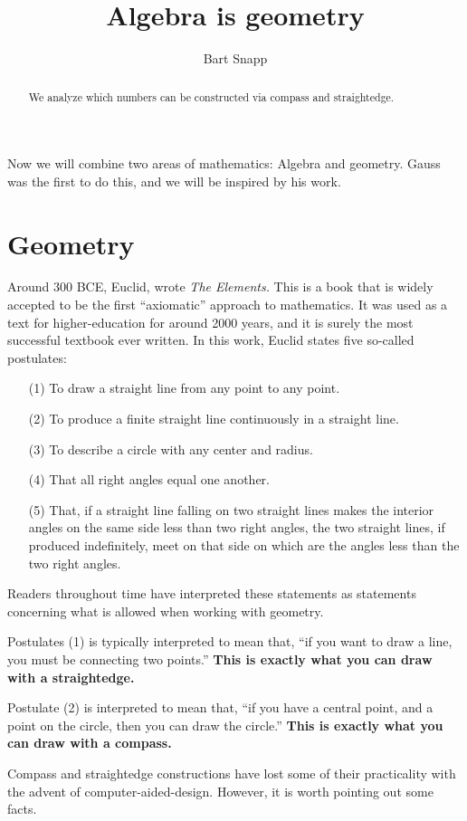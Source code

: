 \documentclass{ximera}
\author{Bart Snapp}
\title{Algebra is geometry}
\begin{document}
\begin{abstract}
  We analyze which numbers can be constructed via compass and
  straightedge.
\end{abstract}
\maketitle


Now we will combine two areas of mathematics: Algebra and
geometry. Gauss was the first to do this, and we will be inspired by
his work.

\section{Geometry}

Around 300 BCE, Euclid, wrote \textit{The Elements.} This is a book
that is widely accepted to be the first ``axiomatic'' approach to
mathematics. It was used as a text for higher-education for around
2000 years, and it is surely the most successful textbook ever
written. In this work, Euclid states five so-called postulates:
\begin{enumerate}
\item[(1)] To draw a straight line from any point to any point.
\item[(2)] To produce a finite straight line continuously in a straight line.
\item[(3)] To describe a circle with any center and radius.
\item[(4)] That all right angles equal one another.
\item[(5)] That, if a straight line falling on two straight lines makes the
  interior angles on the same side less than two right angles, the two
  straight lines, if produced indefinitely, meet on that side on which
  are the angles less than the two right angles.
\end{enumerate}
Readers throughout time have interpreted these statements as statements
concerning what is allowed when working with geometry.

Postulates (1) is typically interpreted to mean that, ``if you want to
draw a line, you must be connecting two points.'' \textbf{This is exactly what
you can draw with a straightedge.}


Postulate (2) is interpreted to mean that, ``if you have a central
point, and a point on the circle, then you can draw the circle.''
\textbf{This is exactly what you can draw with a compass.}

Compass and straightedge constructions have lost some of their
practicality with the advent of computer-aided-design. However, it is
worth pointing out some facts.
\end{document}
